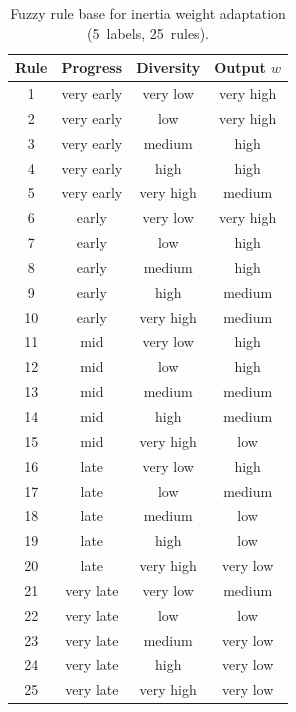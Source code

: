 \begin{table}[htbp]
\caption{Fuzzy rule base for inertia weight adaptation (5~labels, 25~rules).}
\label{tab:rules5}
\centering
\begin{tabular}{@{}cccc@{}}
\toprule
Rule & Progress   & Diversity & Output $w$ \\ \midrule
1  & very early & very low  & very high \\
2  & very early & low       & very high \\
3  & very early & medium    & high      \\
4  & very early & high      & high      \\
5  & very early & very high & medium    \\ \midrule
6  & early      & very low  & very high \\
7  & early      & low       & high      \\
8  & early      & medium    & high      \\
9  & early      & high      & medium    \\
10 & early      & very high & medium    \\ \midrule
11 & mid        & very low  & high      \\
12 & mid        & low       & high      \\
13 & mid        & medium    & medium    \\
14 & mid        & high      & medium    \\
15 & mid        & very high & low       \\ \midrule
16 & late       & very low  & high      \\
17 & late       & low       & medium    \\
18 & late       & medium    & low       \\
19 & late       & high      & low       \\
20 & late       & very high & very low  \\ \midrule
21 & very late  & very low  & medium    \\
22 & very late  & low       & low       \\
23 & very late  & medium    & very low  \\
24 & very late  & high      & very low  \\
25 & very late  & very high & very low  \\ \bottomrule
\end{tabular}
\end{table}

